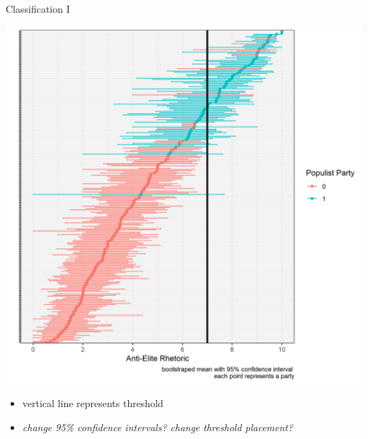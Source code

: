 \documentclass[
  ignorenonframetext,
]{beamer}
\providecommand{\tightlist}{%
  \setlength{\itemsep}{0pt}\setlength{\parskip}{0pt}}
\begin{document}
\begin{frame}{Classification I}
\protect\hypertarget{classification-i}{}

\begin{center}\includegraphics[width=0.9\linewidth,height=0.7\textheight]{PNG/antielite_CHES} \end{center}

\begin{itemize}
\tightlist
\item
  vertical line represents threshold
\item
  \emph{change 95\% confidence intervals? change threshold placement?}
\end{itemize}

\end{frame}
\end{document}
